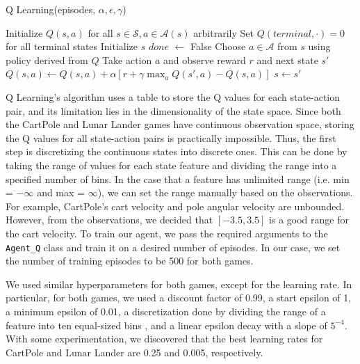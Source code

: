 \documentclass{article}
\begin{document}
\begin{algorithm}[H]
      \caption{Q Learning(episodes, \(\alpha, \epsilon, \gamma\))}
      \label{alg:qlearning}
      \begin{algorithmic}[1]
            \State Initialize \(Q(s,a)\) for all \(s \in \mathcal{S}, a \in \mathcal{A}(s)\) arbitrarily
            \State Set \(Q(terminal, \cdot) = 0 \) for all terminal states
            \State Initialize \(s\)
            \State \(done\) \(\leftarrow\) False
            \State Choose \(a \in \mathcal{A}\) from \(s\) using policy derived from \(Q\) 
            \State Take action \(a\) and observe reward \(r\) and next state \(s'\)
            \State \(Q(s, a) \leftarrow Q(s, a) + \alpha \left[r + \gamma \max_{a} Q(s', a) - Q(s, a)\right]\) 
            \State \(s \leftarrow s'\)
            \EndWhile
            \EndFor
      \end{algorithmic}
\end{algorithm}

Q Learning's algorithm uses a table to store the Q values for each state-action
pair, and its limitation lies in the dimensionality of the state space. Since
both the CartPole and Lunar Lander games have continuous observation space,
storing the Q values for all state-action pairs is practically impossible.
Thus, the first step is discretizing the continuous states into discrete ones.
This can be done by taking the range of values for each state feature and
dividing the range into a specified number of bins. In the case that a feature
has unlimited range (i.e. min = \(-\infty\) and max = \(\infty\)), we can set
the range manually based on the observations. For example, CartPole's cart
velocity and pole angular velocity are unbounded. However, from the
observations, we decided that \([-3.5, 3.5]\) is a good range for the cart
velocity. To train our agent, we pass the required arguments to the
\verb+Agent_Q+ class and train it on a desired number of episodes. In our case,
we set the number of training episodes to be 500 for both games.

We used similar hyperparameters for both games, except for the learning rate.
In particular, for both games, we used a discount factor of 0.99, a start
epsilon of 1, a minimum epsilon of 0.01, a discretization done by dividing the
range of a feature into ten equal-sized bins \cite{discretization_tech}, and a
linear epsilon decay with a slope of \(5^{-4}\). With some experimentation, we
discovered that the best learning rates for CartPole and Lunar Lander are 0.25
and 0.005, respectively.
\end{document}
